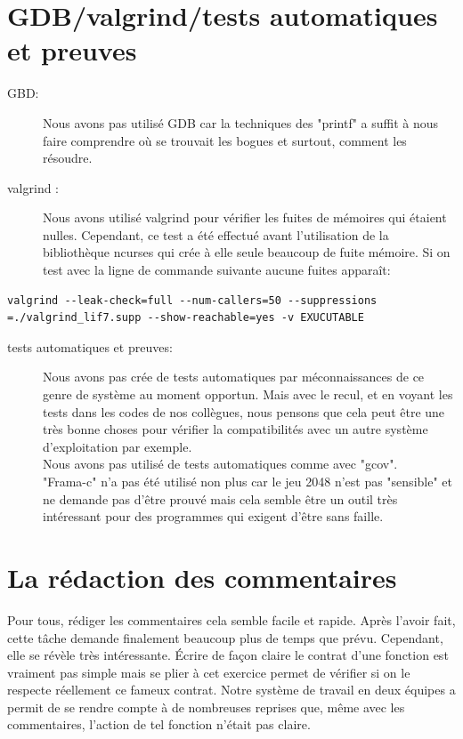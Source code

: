 \documentclass{report}
\begin{document}
\section{GDB/valgrind/tests automatiques et preuves}
\begin{description}
\item[GBD:]
Nous avons pas utilisé GDB car la techniques des "printf" a suffit à nous faire comprendre où se trouvait les bogues et surtout, comment les résoudre.
\item[valgrind :]
Nous avons utilisé valgrind pour vérifier les fuites de mémoires qui étaient nulles. Cependant, ce test a été effectué avant l'utilisation de la bibliothèque ncurses qui crée à elle seule beaucoup de fuite mémoire. Si on test avec la ligne de commande suivante aucune fuites apparaît:
\end{description}
\begin{lstlisting}[frame=single]
valgrind --leak-check=full --num-callers=50 --suppressions
=./valgrind_lif7.supp --show-reachable=yes -v EXUCUTABLE
\end{lstlisting}
\begin{description}
\item[tests automatiques et preuves:]
Nous avons pas crée de tests automatiques par méconnaissances de ce genre de système au moment opportun. Mais avec le recul, et en voyant les tests dans les codes de nos collègues, nous pensons que cela peut être une très bonne choses pour vérifier la compatibilités avec un autre système d'exploitation par exemple.\\
Nous avons pas utilisé de tests automatiques comme avec "gcov". \\"Frama-c" n'a pas été utilisé non plus car le jeu 2048 n'est pas "sensible" et ne demande pas d'être prouvé mais cela semble être un outil très intéressant pour des programmes qui exigent d'être sans faille.
\end{description}
\section{La rédaction des commentaires}
Pour tous, rédiger les commentaires cela semble facile et rapide. Après l'avoir fait, cette tâche demande finalement beaucoup plus de temps que prévu. Cependant, elle se révèle très intéressante. Écrire de façon claire le contrat d'une fonction est vraiment pas simple mais se plier à cet exercice permet de vérifier si on le respecte réellement ce fameux contrat. Notre système de travail en deux équipes a permit de se rendre compte à de nombreuses reprises que, même avec les commentaires, l'action de tel fonction n'était pas claire.
\end{document}
